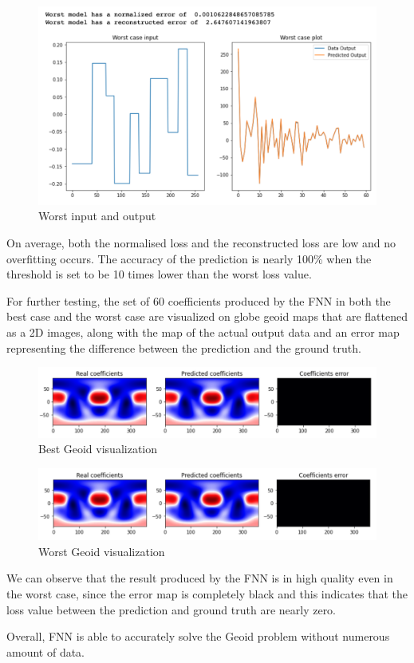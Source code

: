 \begin{figure}[H]
    \caption{Worst input and output}
    \includegraphics[scale=0.6]{Report LaTeX/figures/geoid_images/Geoid_Worst.png}
\end{figure}

On average, both the normalised loss and the reconstructed loss are low and no overfitting occurs. The accuracy of the prediction is nearly 100\% when the threshold is set to be 10 times lower than the worst loss value. 

For further testing, the set of 60 coefficients produced by the FNN in both the best case and the worst case are visualized on globe geoid maps that are flattened as a 2D images, along with the map of the actual output data and an error map representing the difference between the prediction and the ground truth.

\begin{figure}[H]
    \caption{Best Geoid visualization}
    \includegraphics[scale=0.6]{figures/geoid_images/Geoid_Best_visualization.png}
\end{figure}

\begin{figure}[H]
    \caption{Worst Geoid visualization}
    \includegraphics[scale=0.6]{figures/geoid_images/Geoid_Worst_visualization.png}
\end{figure}

We can observe that the result produced by the FNN is in high quality even in the worst case, since the error map is completely black and this indicates that the loss value between the prediction and ground truth are nearly zero.

Overall, FNN is able to accurately solve the Geoid problem without numerous amount of data.


